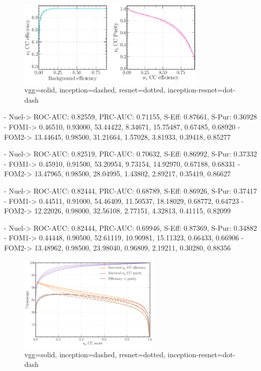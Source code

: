 \begin{figure} %
    \includegraphics[width=0.8\textwidth]{diagrams/7-cvn/chipsnet/arch_nuel_comp_curves.pdf}
    \caption[arch nuel comp curves short]
    {vgg=solid, inception=dashed, resnet=dotted, inception-resnet=dot-dash}
    \label{fig:arch_nuel_comp_curves}
\end{figure}

- Nuel-> ROC-AUC: 0.82559, PRC-AUC: 0.71155, S-Eff: 0.87661, S-Pur: 0.36928
- FOM1-> 0.46510, 0.93000, 53.44422, 8.34671, 15.75487, 0.67485, 0.68920
- FOM2-> 13.44645, 0.98500, 31.21664, 1.57028, 3.81933, 0.39418, 0.85277

- Nuel-> ROC-AUC: 0.82519, PRC-AUC: 0.70632, S-Eff: 0.86992, S-Pur: 0.37332
- FOM1-> 0.45910, 0.91500, 53.20954, 9.73154, 14.92970, 0.67188, 0.68331
- FOM2-> 13.47965, 0.98500, 28.04995, 1.43802, 2.89217, 0.35419, 0.86627

- Nuel-> ROC-AUC: 0.82444, PRC-AUC: 0.68789, S-Eff: 0.86926, S-Pur: 0.37417
- FOM1-> 0.44511, 0.91000, 54.46409, 11.50537, 18.18029, 0.68772, 0.64723
- FOM2-> 12.22026, 0.98000, 32.56108, 2.77151, 4.32813, 0.41115, 0.82099

- Nuel-> ROC-AUC: 0.82444, PRC-AUC: 0.69946, S-Eff: 0.87369, S-Pur: 0.34882
- FOM1-> 0.44448, 0.90500, 52.61119, 10.90981, 15.11323, 0.66433, 0.66906
- FOM2-> 13.48962, 0.98500, 23.98040, 0.96809, 2.19211, 0.30280, 0.88356

\begin{figure} %
    \includegraphics[width=0.6\textwidth]{diagrams/7-cvn/chipsnet/arch_numu_eff_curves.pdf}
    \caption[arch numu eff curves short]
    {vgg=solid, inception=dashed, resnet=dotted, inception-resnet=dot-dash}
    \label{fig:arch_numu_eff_curves}
\end{figure}

